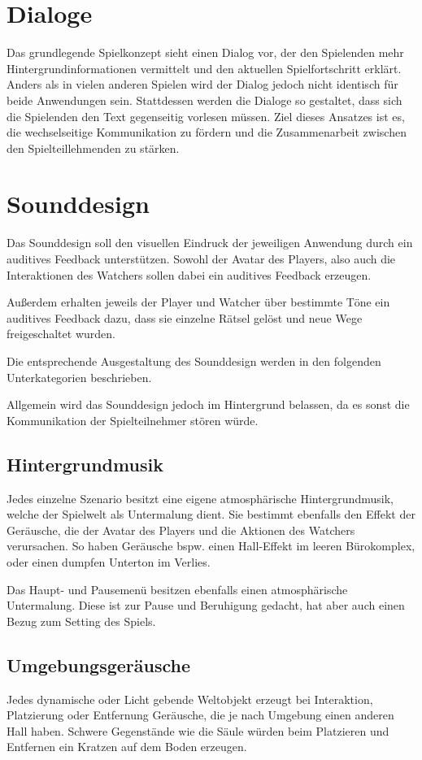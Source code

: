 \section{Dialoge}
Das grundlegende Spielkonzept sieht einen Dialog vor, der den Spielenden mehr Hintergrundinformationen vermittelt und den aktuellen Spielfortschritt erklärt. Anders als in vielen anderen Spielen wird der Dialog jedoch nicht identisch für beide Anwendungen sein. Stattdessen werden die Dialoge so gestaltet, dass sich die Spielenden den Text gegenseitig vorlesen müssen. Ziel dieses Ansatzes ist es, die wechselseitige Kommunikation zu fördern und die Zusammenarbeit zwischen den Spielteillehmenden zu stärken.

\section{Sounddesign}
Das Sounddesign soll den visuellen Eindruck der jeweiligen Anwendung durch ein auditives Feedback unterstützen. Sowohl der Avatar des Players, also auch die Interaktionen des Watchers sollen dabei ein auditives Feedback erzeugen.

Außerdem erhalten jeweils der Player und Watcher über bestimmte Töne ein auditives Feedback dazu, dass sie einzelne Rätsel gelöst und neue Wege freigeschaltet wurden.

Die entsprechende Ausgestaltung des Sounddesign werden in den folgenden Unterkategorien beschrieben.

Allgemein wird das Sounddesign jedoch im Hintergrund belassen, da es sonst die Kommunikation der Spielteilnehmer stören würde.

\subsection{Hintergrundmusik}
Jedes einzelne Szenario besitzt eine eigene atmosphärische Hintergrundmusik, welche der Spielwelt als Untermalung dient. Sie bestimmt ebenfalls den Effekt der Geräusche, die der Avatar des Players und die Aktionen des Watchers verursachen. So haben Geräusche bspw. einen Hall-Effekt im leeren Bürokomplex, oder einen dumpfen Unterton im Verlies.

Das Haupt- und Pausemenü besitzen ebenfalls einen atmosphärische Untermalung. Diese ist zur Pause und Beruhigung gedacht, hat aber auch einen Bezug zum Setting des Spiels.

\subsection{Umgebungsgeräusche}
Jedes dynamische oder Licht gebende Weltobjekt erzeugt bei Interaktion, Platzierung oder Entfernung Geräusche, die je nach Umgebung einen anderen Hall haben. Schwere Gegenstände wie die Säule würden beim Platzieren und Entfernen ein Kratzen auf dem Boden erzeugen. 


